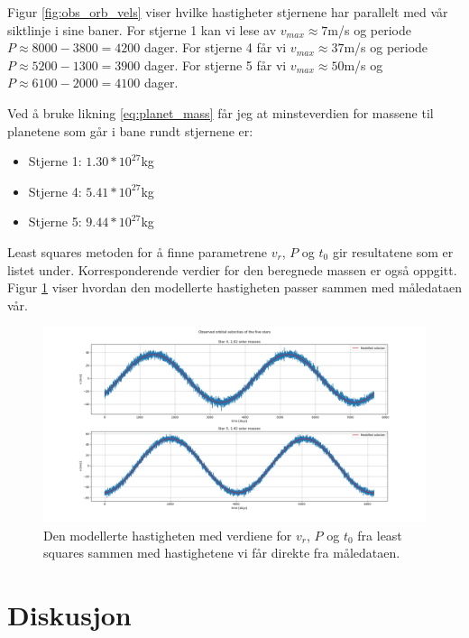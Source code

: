 \documentclass[english,notitlepage]{revtex4-1}  %
\begin{document}
Figur \ref{fig:obs_orb_vels} viser hvilke hastigheter stjernene har parallelt med vår
 siktlinje i sine baner. For stjerne 1 kan vi lese av $v_{max} \approx 7$m/s og periode $P \approx 8000 - 3800 = 4200$ dager. For stjerne 4 får vi $v_{max} \approx 37$m/s og periode $P \approx 5200 - 1300 = 3900$ dager. For stjerne 5 får vi $v_{max} \approx 50$m/s og $P \approx 6100 - 2000 = 4100$ dager.

Ved å bruke likning \ref{eq:planet_mass} får jeg at minsteverdien for massene til
 planetene som går i bane rundt stjernene er:
 \begin{itemize}
  \item Stjerne 1: $1.30*10^{27}$kg
  \item Stjerne 4: $5.41*10^{27}$kg
  \item Stjerne 5: $9.44*10^{27}$kg
 \end{itemize}

Least squares metoden for å finne parametrene $v_r$, $P$ og $t_0$ gir resultatene som
 er listet under. Korresponderende verdier for den beregnede massen er også oppgitt. Figur \ref{fig:modelled_vel} viser hvordan den modellerte hastigheten passer sammen med måledataen vår.


\begin{figure}
  \includegraphics[width=\linewidth]{../output/plots/modelled_vel.jpg}
  \caption{Den modellerte hastigheten med verdiene for $v_r$, $P$ og $t_0$ fra least squares sammen med hastighetene vi får direkte fra måledataen.}
  \label{fig:modelled_vel}
\end{figure}



\section{Diskusjon}
\end{document}
